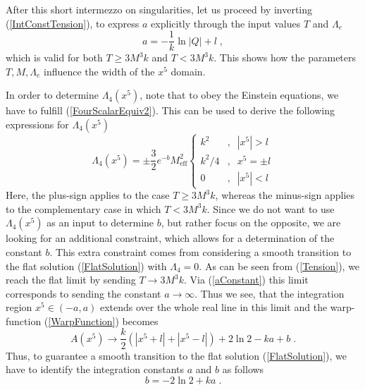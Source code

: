 \documentclass[a4paper,12pt]{article}
\begin{document}
After this short intermezzo on singularities, let us proceed by
inverting (\ref{IntConstTension}), to express $a$ explicitly through
the input values $T$ and $\Lambda_e$
\begin{equation}
   a = -\frac{1}{k}\ln |Q| + l \; ,
   \label{aConstant}
\end{equation}
which is valid for both $T \ge 3M^3 k$ and
$T < 3M^3 k$. This shows how the parameters $T,M,\Lambda_e$
influence the width of the $x^5$ domain. 

In order to determine $\Lambda_4(x^5)$, note that to obey the Einstein
equations, we have to fulfill (\ref{FourScalarEquiv2}). This can be used
to derive the following expressions for $\Lambda_4(x^5)$
\begin{equation}
            \Lambda_4(x^5)
          = \pm\frac{3}{2}e^{-b}M^2_{\text{eff}}
            \left\{ \begin{array}{cc}
                    k^2   &,\;\; |x^5| > l \\
                    k^2/4 &,\;\; x^5 = \pm l \\
                      0      &,\;\; |x^5| < l
                    \end{array}
            \right.
     \label{SectionCoCo}
\end{equation}
Here, the plus-sign applies to the case $T\ge 3M^3 k$, whereas the
minus-sign applies to the complementary case in which $T < 3M^3 k$.
Since we do not want to use $\Lambda_4(x^5)$ as an input to determine
$b$, but rather focus on the opposite, we are looking for an
additional constraint, which allows for a determination of the
constant $b$. This extra constraint comes from considering a smooth
transition to the flat solution (\ref{FlatSolution}) with
$\Lambda_4=0$. As can be seen from (\ref{Tension}), we reach the flat
limit by sending $T\rightarrow 3M^3 k$. Via (\ref{aConstant}) this
limit corresponds to sending the constant $a\rightarrow \infty$. Thus
we see, that the integration region $x^5 \in (-a,a)$ extends over the
whole real line in this limit and the warp-function
(\ref{WarpFunction}) becomes
\begin{equation}
  A(x^5) \rightarrow \frac{k}{2}\left(|x^5+l|+|x^5-l|\right)
                     +2\ln 2-ka+b \; .
\end{equation}
Thus, to guarantee a smooth transition to the flat solution
(\ref{FlatSolution}), we have to identify 
the integration constants $a$ and $b$ as follows
\begin{equation}
  b = -2\ln 2+ka \; .
\end{equation}
\end{document}
